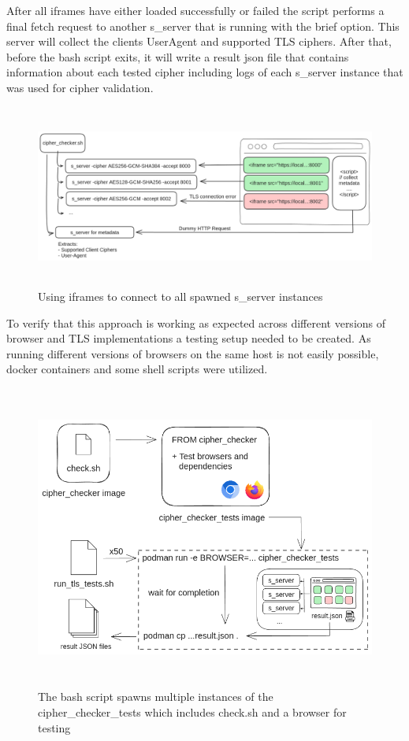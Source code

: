 \documentclass[12pt]{scrbook}
\begin{document}
After all iframes have either loaded successfully or failed the script performs a final fetch request to another
s\_server that is running with the \-brief option. This server will collect the clients User\-Agent and supported TLS ciphers.
After that, before the bash script exits, it will write a result json file that contains information about each tested cipher including logs
of each s\_server instance that was used for cipher validation.

\begin{figure}[!h]
  \centering
  \includegraphics[height=6cm]{./images/cipher_check_setup.png}
  \caption{Using iframes to connect to all spawned s\_server instances}
\end{figure}

\clearpage

To verify that this approach is working as expected across different versions of browser
and TLS implementations a testing setup needed to be created. As running different versions of
browsers on the same host is not easily possible, docker containers and some shell scripts were
utilized.

\begin{figure}[!h]
  \centering
  \includegraphics[height=10cm]{./images/cipher_checker_tests.png}
  \caption{The bash script spawns multiple instances of the cipher\_checker\_tests which includes check.sh and a browser for testing}
\end{figure}
\end{document}
